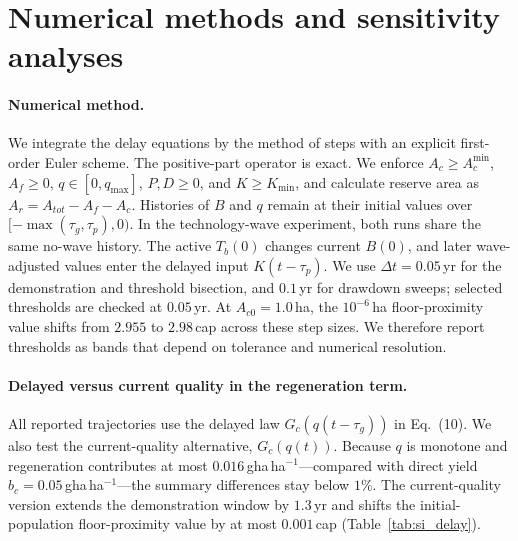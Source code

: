 \documentclass[11pt,a4paper]{article}
\newcommand{\Acmin}{A_c^{\min}}
\begin{document}
\section{Numerical methods and sensitivity analyses}\label{si:numerics}

\paragraph{Numerical method.} We integrate the delay equations by the method of steps with an explicit first-order Euler scheme. The positive-part operator is exact. We enforce $A_c\ge\Acmin$, $A_f\ge0$, $q\in[0,q_{\max}]$, $P,D\ge0$, and $K\ge K_{\min}$, and calculate reserve area as $A_r=A_{tot}-A_f-A_c$. Histories of $B$ and $q$ remain at their initial values over $[-\max(\tau_g,\tau_p),0)$. In the technology-wave experiment, both runs share the same no-wave history. The active $T_b(0)$ changes current $B(0)$, and later wave-adjusted values enter the delayed input $K(t-\tau_p)$. We use $\Delta t=0.05$\,yr for the demonstration and threshold bisection, and $0.1$\,yr for drawdown sweeps; selected thresholds are checked at $0.05$\,yr. At $A_{c0}=1.0$\,ha, the $10^{-6}$\,ha floor-proximity value shifts from $2.955$ to $2.98$\,cap across these step sizes. We therefore report thresholds as bands that depend on tolerance and numerical resolution.

\paragraph{Delayed versus current quality in the regeneration term.} All reported trajectories use the delayed law $G_c(q(t-\tau_g))$ in Eq.~(10). We also test the current-quality alternative, $G_c(q(t))$. Because $q$ is monotone and regeneration contributes at most $0.016$\,gha\,ha$^{-1}$—compared with direct yield $b_c=0.05$\,gha\,ha$^{-1}$—the summary differences stay below $1\%$. The current-quality version extends the demonstration window by $1.3$\,yr and shifts the initial-population floor-proximity value by at most $0.001$\,cap (Table~\ref{tab:si_delay}).
\end{document}
